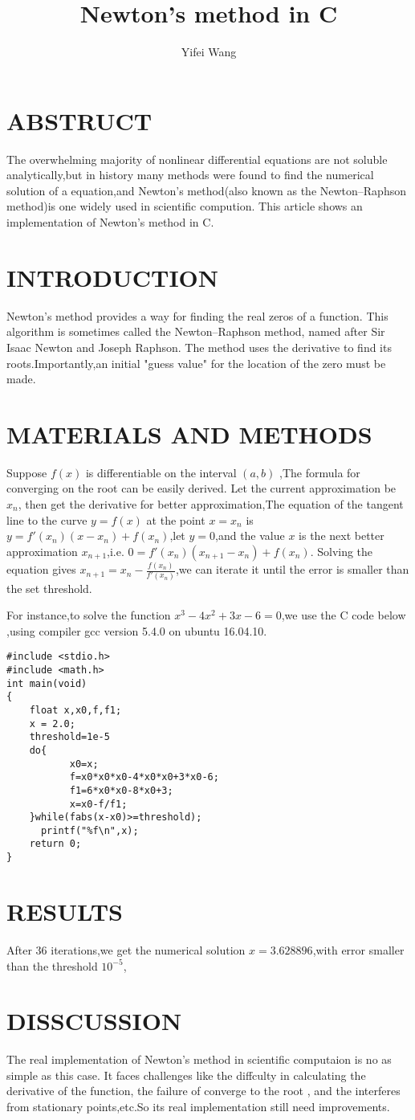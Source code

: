 \documentclass{article}
\title{Newton's method in C}
\author{Yifei Wang}
\begin{document}
\maketitle
\section{ABSTRUCT}
The overwhelming majority of nonlinear differential equations are not soluble analytically,but in history many methods were found to find the numerical solution of a equation,and Newton's method(also known as the Newton–Raphson method)is one widely used in scientific compution. This article shows an implementation of Newton's method in C.
\section{INTRODUCTION}
Newton's method provides a way for finding the real zeros of a function. This algorithm is sometimes called the Newton–Raphson method, named after Sir Isaac Newton and Joseph Raphson.
The method uses the derivative to find its roots.Importantly,an initial "guess value" for the location of the zero must be made.

\section{MATERIALS AND METHODS}
Suppose $f(x)$ is differentiable on the interval $(a,b)$ ,The formula for converging on the root can be easily derived.
Let the current approximation be $x_n$, then get the derivative for better approximation,The equation of the tangent line to the curve $y=f(x)$ at the point $x=x_n$ is $y=f'(x_n)(x-x_n)+f(x_n)$,let $y=0$,and the value $x$ is the next better approximation $x_{n+1}$,i.e. $0=f'(x_n)(x_{n+1}-x_n)+f(x_n)$.
Solving the equation gives $x_{n+1}=x_n-\frac{f(x_n)}{f'(x_n)}$,we can iterate it until the error is smaller than the set threshold.

For instance,to solve the function $x^3-4x^2+3x-6=0$,we use the C code below ,using compiler gcc version 5.4.0 on ubuntu 16.04.10.
\begin{lstlisting}
#include <stdio.h>
#include <math.h> 
int main(void)
{
 	float x,x0,f,f1; 
 	x = 2.0;
 	threshold=1e-5
	do{ 
	       x0=x;
	       f=x0*x0*x0-4*x0*x0+3*x0-6;
	       f1=6*x0*x0-8*x0+3;
	       x=x0-f/f1;       
	}while(fabs(x-x0)>=threshold);
	  printf("%f\n",x);
 	return 0;
}
\end{lstlisting}
\section{RESULTS}
After 36 iterations,we get the numerical solution $x=3.628896$,with error smaller than the threshold $10^{-5}$,
\section{DISSCUSSION}
The real implementation of Newton's method in scientific computaion is no as simple as this case. It faces challenges like the diffculty in calculating the derivative of the function, the failure of converge to the root , and the      interferes from stationary points,etc.So its real implementation still need improvements.
\end{document}

